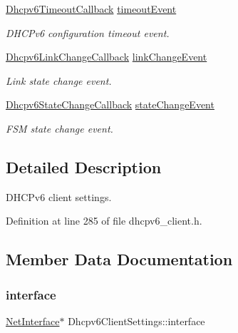\begin{DoxyCompactItemize}
\hyperlink{dhcpv6__client_8h_afa288458e5e628c6f13cd8823bd8a559}{Dhcpv6\+Timeout\+Callback} \hyperlink{structDhcpv6ClientSettings_a8ff0d3224eec61ef47ae19eccb8b0026}{timeout\+Event}
\begin{DoxyCompactList}\small\item\em D\+H\+C\+Pv6 configuration timeout event. \end{DoxyCompactList}\item 
\hyperlink{dhcpv6__client_8h_ae518d21ffd3e2e6bcd552774d398dc7d}{Dhcpv6\+Link\+Change\+Callback} \hyperlink{structDhcpv6ClientSettings_a89a8117f9bc78b5beeddca6fc6711ac5}{link\+Change\+Event}
\begin{DoxyCompactList}\small\item\em Link state change event. \end{DoxyCompactList}\item 
\hyperlink{dhcpv6__client_8h_a40ca3757aa5a1b6e7e922eb0533f3b8b}{Dhcpv6\+State\+Change\+Callback} \hyperlink{structDhcpv6ClientSettings_aff55e81ba995a9eec72e25079de19280}{state\+Change\+Event}
\begin{DoxyCompactList}\small\item\em F\+SM state change event. \end{DoxyCompactList}\end{DoxyCompactItemize}


\subsection{Detailed Description}
D\+H\+C\+Pv6 client settings. 

Definition at line 285 of file dhcpv6\+\_\+client.\+h.



\subsection{Member Data Documentation}
\mbox{\label{structDhcpv6ClientSettings_ad74dca8474a1b0f8641dd2395ec910df}} 
\subsubsection{\texorpdfstring{interface}{interface}}
{\footnotesize\ttfamily \hyperlink{net_8h_a2234db8911a1148c9159979d8f5e0d6b}{Net\+Interface}$\ast$ Dhcpv6\+Client\+Settings\+::interface}



